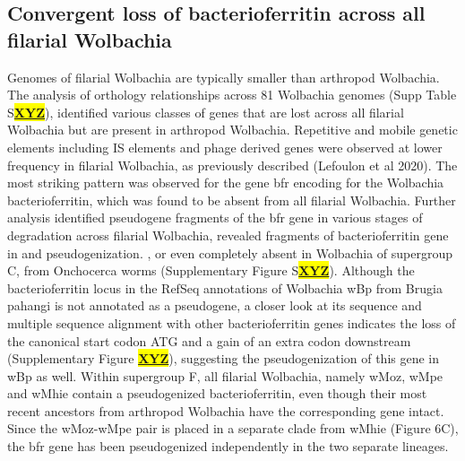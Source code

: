 \documentclass[10pt, a4paper, twocolumn]{article} %
\begin{document}
\subsection{Convergent loss of bacterioferritin across all filarial Wolbachia}
Genomes of filarial Wolbachia are typically smaller than arthropod Wolbachia. The analysis of orthology relationships across 81 Wolbachia genomes (Supp Table S\underline{\textbf{\colorbox{Yellow}{XYZ}}}), identified various classes of genes that are lost across all filarial Wolbachia but are present in arthropod Wolbachia. Repetitive and mobile genetic elements including IS elements and phage derived genes were observed at lower frequency in filarial Wolbachia, as previously described (Lefoulon et al 2020). The most striking pattern was observed for the gene bfr encoding for the Wolbachia bacterioferritin, which was found to be absent from all filarial Wolbachia. Further analysis identified pseudogene fragments of the bfr gene in various stages of degradation across filarial Wolbachia, revealed fragments of bacterioferritin gene in and pseudogenization. , or even completely absent in Wolbachia of supergroup C, from Onchocerca worms (Supplementary Figure S\underline{\textbf{\colorbox{Yellow}{XYZ}}}). Although the bacterioferritin locus in the RefSeq annotations of Wolbachia wBp from Brugia pahangi is not annotated as a pseudogene, a closer look at its sequence and multiple sequence alignment with other bacterioferritin genes indicates the loss of the canonical start codon ATG and a gain of an extra codon downstream (Supplementary Figure \underline{\textbf{\colorbox{Yellow}{XYZ}}}), suggesting the pseudogenization of this gene in wBp as well.  Within supergroup F, all filarial Wolbachia, namely wMoz, wMpe and wMhie contain a pseudogenized bacterioferritin, even though their most recent ancestors from arthropod Wolbachia have the corresponding gene intact. Since the wMoz-wMpe pair is placed in a separate clade from wMhie (Figure 6C), the bfr gene has been pseudogenized independently in the two separate lineages. 
\end{document}
